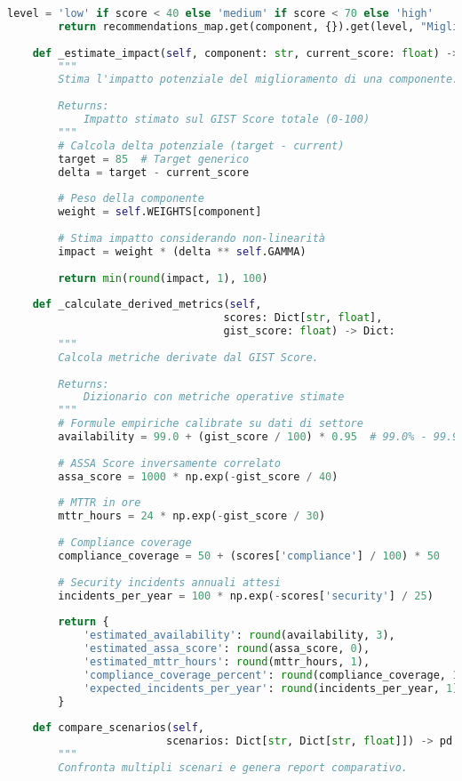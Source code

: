 \begin{lstlisting}[language=Python, caption={Implementazione completa GIST Calculator con validazione e reporting}]
        level = 'low' if score < 40 else 'medium' if score < 70 else 'high'
        return recommendations_map.get(component, {}).get(level, "Miglioramento generale richiesto")
    
    def _estimate_impact(self, component: str, current_score: float) -> float:
        """
        Stima l'impatto potenziale del miglioramento di una componente.
        
        Returns:
            Impatto stimato sul GIST Score totale (0-100)
        """
        # Calcola delta potenziale (target - current)
        target = 85  # Target generico
        delta = target - current_score
        
        # Peso della componente
        weight = self.WEIGHTS[component]
        
        # Stima impatto considerando non-linearità
        impact = weight * (delta ** self.GAMMA) 
        
        return min(round(impact, 1), 100)
    
    def _calculate_derived_metrics(self, 
                                  scores: Dict[str, float],
                                  gist_score: float) -> Dict:
        """
        Calcola metriche derivate dal GIST Score.
        
        Returns:
            Dizionario con metriche operative stimate
        """
        # Formule empiriche calibrate su dati di settore
        availability = 99.0 + (gist_score / 100) * 0.95  # 99.0% - 99.95%
        
        # ASSA Score inversamente correlato
        assa_score = 1000 * np.exp(-gist_score / 40)
        
        # MTTR in ore
        mttr_hours = 24 * np.exp(-gist_score / 30)
        
        # Compliance coverage
        compliance_coverage = 50 + (scores['compliance'] / 100) * 50
        
        # Security incidents annuali attesi
        incidents_per_year = 100 * np.exp(-scores['security'] / 25)
        
        return {
            'estimated_availability': round(availability, 3),
            'estimated_assa_score': round(assa_score, 0),
            'estimated_mttr_hours': round(mttr_hours, 1),
            'compliance_coverage_percent': round(compliance_coverage, 1),
            'expected_incidents_per_year': round(incidents_per_year, 1)
        }
    
    def compare_scenarios(self, 
                         scenarios: Dict[str, Dict[str, float]]) -> pd.DataFrame:
        """
        Confronta multipli scenari e genera report comparativo.
        

\end{lstlisting}

